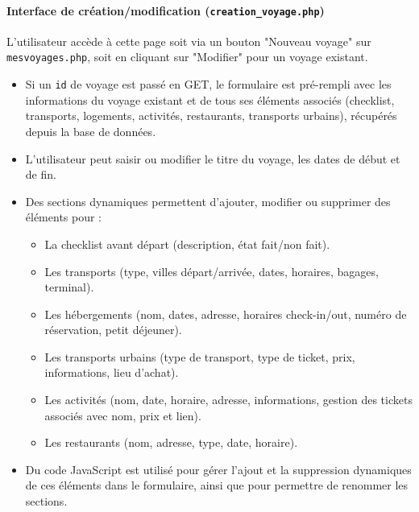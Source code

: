 \documentclass[a4paper,12pt]{article}
\begin{document}
\paragraph{Interface de création/modification (\texttt{creation\_voyage.php})}
L'utilisateur accède à cette page soit via un bouton "Nouveau voyage" sur \texttt{mesvoyages.php}, soit en cliquant sur "Modifier" pour un voyage existant.
\begin{itemize}
    \item Si un \texttt{id} de voyage est passé en GET, le formulaire est pré-rempli avec les informations du voyage existant et de tous ses éléments associés (checklist, transports, logements, activités, restaurants, transports urbains), récupérés depuis la base de données.
    \item L'utilisateur peut saisir ou modifier le titre du voyage, les dates de début et de fin.
    \item Des sections dynamiques permettent d'ajouter, modifier ou supprimer des éléments pour :
    \begin{itemize}
        \item La checklist avant départ (description, état fait/non fait).
        \item Les transports (type, villes départ/arrivée, dates, horaires, bagages, terminal).
        \item Les hébergements (nom, dates, adresse, horaires check-in/out, numéro de réservation, petit déjeuner).
        \item Les transports urbains (type de transport, type de ticket, prix, informations, lieu d'achat).
        \item Les activités (nom, date, horaire, adresse, informations, gestion des tickets associés avec nom, prix et lien).
        \item Les restaurants (nom, adresse, type, date, horaire).
    \end{itemize}
    \item Du code JavaScript est utilisé pour gérer l'ajout et la suppression dynamiques de ces éléments dans le formulaire, ainsi que pour permettre de renommer les sections.
\end{itemize}
\end{document}
